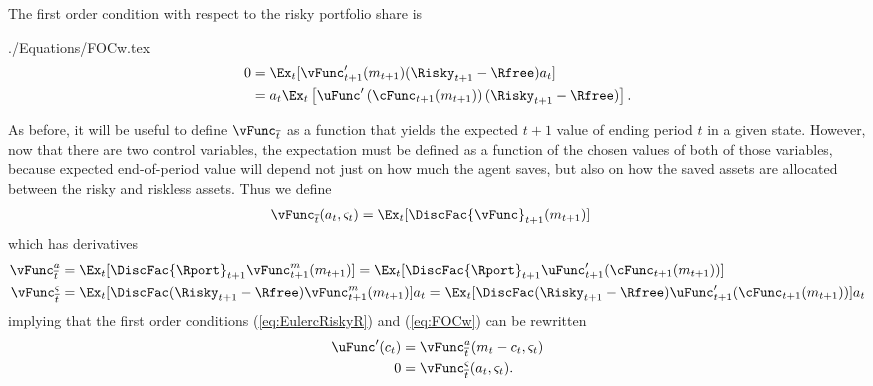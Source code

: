 \documentclass[titlepage, headings=optiontotocandhead]{\econtex}
\begin{document}
The first order condition with respect to the risky portfolio share is
\begin{verbatimwrite}{./Equations/FOCw.tex}
  \begin{equation}\begin{gathered}\begin{aligned}
        0  & = \Ex_{t}[{\vFunc}_{t+1}^{\prime}({m}_{t+1})(\Risky_{t+1}-\Rfree){a}_{t}] \notag
        \\         & = {a}_{t}\Ex_{t}\left[\uFunc^{\prime}\left(\cFunc_{t+1}({m}_{t+1})\right)(\Risky_{t+1}-\Rfree)\right] \label{eq:FOCw}.
      \end{aligned}\end{gathered}\end{equation}
\end{verbatimwrite}
\unskip

As before, it will be useful to define $\vEOPt$ as a function that
yields the expected $t+1$ value of ending period $t$ in a given state.
However, now that there are two control variables, the expectation
must be defined as a function of the chosen values of both of those
variables, because expected end-of-period value will depend not just
on how much the agent saves, but also on how the saved assets are
allocated between the risky and riskless assets.  Thus we define
\begin{equation*}\begin{gathered}\begin{aligned}
      \vEOPt({a}_{t},\varsigma_{t})  & = \Ex_{t}[\DiscFac {\vFunc}_{t+1}({m}_{t+1})]
    \end{aligned}\end{gathered}\end{equation*}
which has derivatives
\begin{equation}\begin{gathered}\begin{aligned}
      \vEOPt^{{a}}  & = \Ex_{t}[\DiscFac {\Rport}_{t+1}{\vFunc}_{t+1}^{m}({m}_{t+1})] = \Ex_{t}[\DiscFac {\Rport}_{t+1}{\uFunc}_{t+1}^{\prime}(\cFunc_{t+1}({m}_{t+1}))]
      \\      \vEOPt^{\varsigma}  & = \Ex_{t}[\DiscFac (\Risky_{t+1}-\Rfree){\vFunc}_{t+1}^{m}({m}_{t+1})  ]a_{t} = \Ex_{t}[\DiscFac (\Risky_{t+1}-\Rfree){\uFunc}_{t+1}^{\prime}(\cFunc_{t+1}({m}_{t+1}))  ]a_{t} \notag
    \end{aligned}\end{gathered}\end{equation}
implying that the first order conditions (\ref{eq:EulercRiskyR}) and
(\ref{eq:FOCw}) can be rewritten
\begin{equation}\begin{gathered}\begin{aligned}
      \uFunc^{\prime}({c}_{t})  & = \vEOPt^{{a}}({m}_{t}-{c}_{t},\varsigma_{t})
      \\      0  & = \vFunc^{\varsigma}_{\overline{t}}({a}_{t},\varsigma_{t}).
    \end{aligned}\end{gathered}\end{equation}
\end{document}

